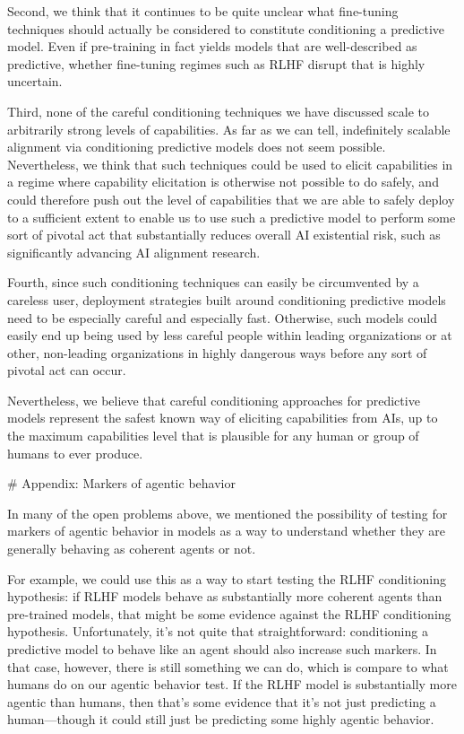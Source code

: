 {{Second, we think that it continues to be quite unclear what fine-tuning techniques should actually be considered to constitute conditioning a predictive model. Even if pre-training in fact yields models that are well-described as predictive, whether fine-tuning regimes such as RLHF disrupt that is highly uncertain.

Third, none of the careful conditioning techniques we have discussed scale to arbitrarily strong levels of capabilities. As far as we can tell, indefinitely scalable alignment via conditioning predictive models does not seem possible. Nevertheless, we think that such techniques could be used to elicit capabilities in a regime where capability elicitation is otherwise not possible to do safely, and could therefore push out the level of capabilities that we are able to safely deploy to a sufficient extent to enable us to use such a predictive model to perform some sort of pivotal act that substantially reduces overall AI existential risk, such as significantly advancing AI alignment research.

Fourth, since such conditioning techniques can easily be circumvented by a careless user, deployment strategies built around conditioning predictive models need to be especially careful and especially fast. Otherwise, such models could easily end up being used by less careful people within leading organizations or at other, non-leading organizations in highly dangerous ways before any sort of pivotal act can occur.

Nevertheless, we believe that careful conditioning approaches for predictive models represent the safest known way of eliciting capabilities from AIs, up to the maximum capabilities level that is plausible for any human or group of humans to ever produce.


# Appendix: Markers of agentic behavior

In many of the open problems\cite{TODO: cite TODO} above, we mentioned the possibility of testing for markers of agentic behavior in models as a way to understand whether they are generally behaving as coherent agents or not.

For example, we could use this as a way to start testing the RLHF conditioning hypothesis: if RLHF models behave as substantially more coherent agents than pre-trained models, that might be some evidence against the RLHF conditioning hypothesis. Unfortunately, it's not quite that straightforward: conditioning a predictive model to behave like an agent should also increase such markers. In that case, however, there is still something we can do, which is compare to what humans do on our agentic behavior test. If the RLHF model is substantially more agentic than humans, then that's some evidence that it's not just predicting a human---though it could still just be predicting some highly agentic behavior.

}}
